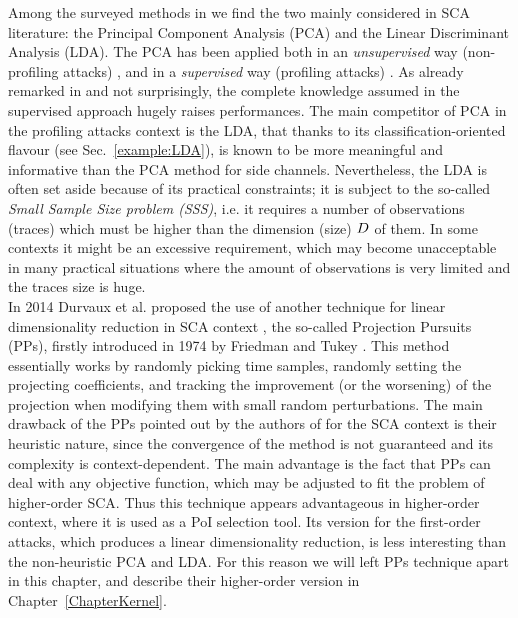 Among the surveyed methods in \cite{cunningham2015linear} we find the two mainly considered in SCA literature: the Principal Component Analysis (PCA) and the Linear Discriminant Analysis (LDA). The PCA has been applied both in an {\em unsupervised} way (\ie non-profiling attacks) \cite{Batina2012,karsmakers2009side}, and in a {\em supervised} way (\ie profiling attacks) \cite{TAprincipal,choudaryefficient,choudary2014efficient,disassembler,Standaert2008}. As already remarked in \cite{disassembler} and not surprisingly, the complete knowledge assumed in the supervised approach hugely raises performances. The main competitor of PCA in the profiling attacks context is the LDA, that thanks to its classification-oriented flavour (see Sec.~\ref{example:LDA}), is known to be more meaningful and informative \cite{lessIsMore,Standaert2008} than the PCA method  for side channels. Nevertheless, the LDA is often set aside because of its practical constraints; it is subject to the so-called {\em Small Sample Size problem (SSS)}, i.e. it requires a number of observations (traces) which must be higher than the dimension (size) $D$ of them. In some contexts it might be an excessive requirement, which may become unacceptable in many practical situations where the amount of observations is very limited and the traces size is huge.\\

In 2014 Durvaux et al. proposed the use of another technique for linear dimensionality reduction in SCA context \cite{PP}, the so-called Projection Pursuits (PPs), firstly introduced in 1974 by Friedman and Tukey \cite{friedman1974projection}. This method essentially works by randomly picking time samples, randomly setting the projecting coefficients, and tracking the improvement (or the worsening) of the projection when modifying
them with small random perturbations. The main drawback of the PPs  pointed out by the authors of \cite{PP} for the SCA context is their heuristic nature,
since the convergence of the method is not guaranteed and its complexity is
context-dependent. The main advantage is the fact that
PPs can deal with any objective function, which may be adjusted to fit the problem
of higher-order SCA. Thus this technique appears advantageous in higher-order context, where it is used as a PoI selection tool. Its version for the first-order attacks, which produces a linear dimensionality reduction, is less interesting than the non-heuristic PCA and LDA. For this reason we will left PPs technique apart in this chapter, and describe their higher-order version in Chapter~\ref{ChapterKernel}.

